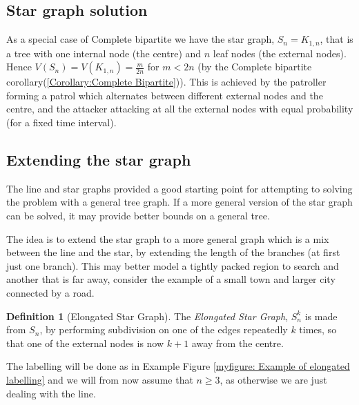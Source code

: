 \documentclass[a4paper,10pt]{article}
\theoremstyle{definition}
\newtheorem{definition}[theorem]{Definition}
\theoremstyle{definition}
\theoremstyle{remark}
\theoremstyle{definition}
\begin{document}
\subsection{Star graph solution}
As a special case of Complete bipartite we have the star graph, $S_{n}=K_{1,n}$, that is a tree with one internal node (the centre) and $n$ leaf nodes (the external nodes). Hence $V(S_{n})=V(K_{1,n})=\frac{m}{2n}$ for $m<2n$ (by the Complete bipartite corollary(\ref{Corollary:Complete Bipartite})). This is achieved by the patroller forming a patrol which alternates between different  external nodes and the centre, and the attacker attacking at all the external nodes with equal probability (for a fixed time interval).


\subsection{Extending the star graph}
The line and star graphs provided a good starting point for attempting to solving the problem with a general tree graph. If a more general version of the star graph can be solved, it may provide better bounds on a general tree. 

The idea is to extend the star graph to a more general graph which is a mix between the line and the star, by extending the length of the branches (at first just one branch). This may better model a tightly packed region to search and another that is far away, consider the example of a small town and larger city connected by a road. 

\begin{definition}[Elongated Star Graph]
The \textit{Elongated Star Graph}, $S_{n}^{k}$ is made from $S_{n}$, by performing subdivision on one of the edges repeatedly $k$ times, so that one of the external nodes is now $k+1$ away from the centre.
\end{definition}

The labelling will be done as in Example Figure \ref{myfigure: Example of elongated labelling} and we will from now assume that $n \geq 3$, as otherwise we are just dealing with the line.
\end{document}
